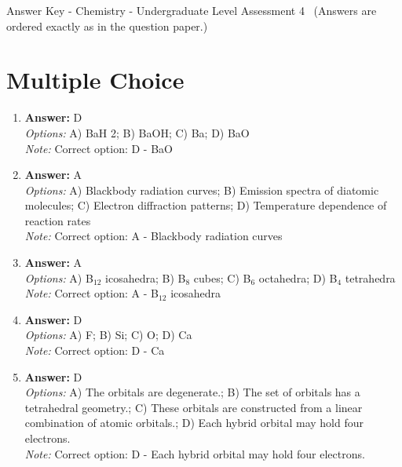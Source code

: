 \documentclass[12pt]{article}
\begin{document}
\begin{center}
Answer Key - Chemistry - Undergraduate Level Assessment 4 \
\small (Answers are ordered exactly as in the question paper.)
\end{center}

\section*{Multiple Choice}
\begin{enumerate}[label=\arabic*.]
\item \textbf{Answer:} D
\\ \textit{Options:} A) BaH 2; B) BaOH; C) Ba; D) BaO
\\ \textit{Note:} Correct option: D - BaO
\item \textbf{Answer:} A
\\ \textit{Options:} A) Blackbody radiation curves; B) Emission spectra of diatomic molecules; C) Electron diffraction patterns; D) Temperature dependence of reaction rates
\\ \textit{Note:} Correct option: A - Blackbody radiation curves
\item \textbf{Answer:} A
\\ \textit{Options:} A) B$_{12}$ icosahedra; B) B$_{8}$ cubes; C) B$_{6}$ octahedra; D) B$_{4}$ tetrahedra
\\ \textit{Note:} Correct option: A - B$_{12}$ icosahedra
\item \textbf{Answer:} D
\\ \textit{Options:} A) F; B) Si; C) O; D) Ca
\\ \textit{Note:} Correct option: D - Ca
\item \textbf{Answer:} D
\\ \textit{Options:} A) The orbitals are degenerate.; B) The set of orbitals has a tetrahedral geometry.; C) These orbitals are constructed from a linear combination of atomic orbitals.; D) Each hybrid orbital may hold four electrons.
\\ \textit{Note:} Correct option: D - Each hybrid orbital may hold four electrons.
\end{enumerate}
\end{document}
